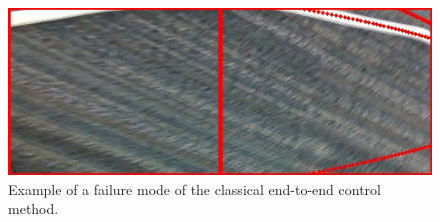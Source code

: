 \begin{figure}
  \centering
  \includegraphics[scale=0.5]{figures/classical_fail.jpg}
  \caption{Example of a failure mode of the classical end-to-end control method.}
  \label{fig:classical_fail}
\end{figure}
